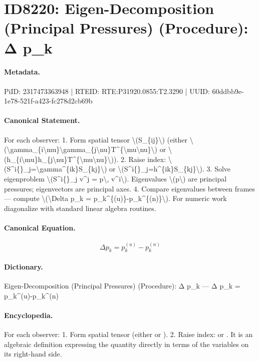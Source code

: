 \section*{ID8220: Eigen-Decomposition (Principal Pressures) (Procedure): Δ p\_k}
\paragraph{Metadata.}
PiID: 2317473363948 | RTEID: RTE:P31920.0855:T2.3290 | UUID: 60ddbb9e-1e78-521f-a423-fc278d2cb69b

\paragraph{Canonical Statement.}
For each observer: 1. Form spatial tensor \textbackslash{}(S\_\{ij\}\textbackslash{}) (either \textbackslash{}(\textbackslash{}gamma\_\{i\textbackslash{}mu\}\textbackslash{}gamma\_\{j\textbackslash{}nu\}T\textasciicircum{}\{\textbackslash{}mu\textbackslash{}nu\}\textbackslash{}) or \textbackslash{}(h\_\{i\textbackslash{}mu\}h\_\{j\textbackslash{}nu\}T\textasciicircum{}\{\textbackslash{}mu\textbackslash{}nu\}\textbackslash{})). 2. Raise index: \textbackslash{}(S\textasciicircum{}i\{\}\_j=\textbackslash{}gamma\textasciicircum{}\{ik\}S\_\{kj\}\textbackslash{}) or \textbackslash{}(S\textasciicircum{}i\{\}\_j=h\textasciicircum{}\{ik\}S\_\{kj\}\textbackslash{}). 3. Solve eigenproblem \textbackslash{}(S\textasciicircum{}i\{\}\_j v\textasciicircum{}j = p\textbackslash{}, v\textasciicircum{}i\textbackslash{}). Eigenvalues \textbackslash{}(p\textbackslash{}) are principal pressures; eigenvectors are principal axes. 4. Compare eigenvalues between frames — compute \textbackslash{}(\textbackslash{}Delta p\_k = p\_k\textasciicircum{}\{(u)\}-p\_k\textasciicircum{}\{(n)\}\textbackslash{}). For numeric work diagonalize with standard linear algebra routines.

\paragraph{Canonical Equation.}
\[
\Delta p_k = p_k^{(u)}-p_k^{(n)}
\]

\paragraph{Dictionary.}
Eigen-Decomposition (Principal Pressures) (Procedure): Δ p\_k — Δ p\_k = p\_k\textasciicircum{}(u)-p\_k\textasciicircum{}(n)

\paragraph{Encyclopedia.}
For each observer: 1. Form spatial tensor (either or ). 2. Raise index: or . It is an algebraic definition expressing the quantity directly in terms of the variables on its right-hand side.

